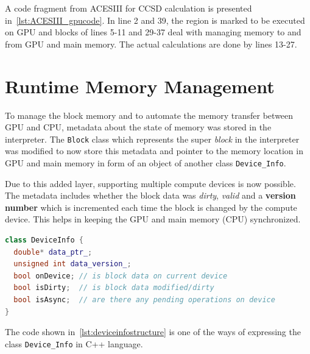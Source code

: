 A code fragment from ACESIII for CCSD calculation is presented
in~\ref{lst:ACESIII_gpucode}. In line 2 and 39, the region is marked to be executed
on GPU and blocks of lines 5-11 and 29-37 deal with managing memory to and from
GPU and main memory. The actual calculations are done by lines 13-27.

\section{Runtime Memory Management}
To manage the block memory and to automate the memory transfer between GPU and CPU,
metadata about the state of memory was stored in the interpreter. The \texttt{Block} class
which represents the super \textit{block} in the interpreter was modified to now store
this metadata and pointer to the memory location in GPU and main memory in form of
an object of another class \texttt{Device\_Info}.

Due to this added layer, supporting multiple compute devices is now possible.
The metadata includes whether the block data was \textit{dirty}, \textit{valid}
and a \textbf{version number} which is incremented each time the block is changed
by the compute device. This helps in keeping the GPU and main memory (CPU)
synchronized.

\begin{lstlisting}[caption={\texttt{Device\_Info} Class structure},
  language=C++,
  label={lst:deviceinfostructure}]
class DeviceInfo {
  double* data_ptr_;
  unsigned int data_version_;
  bool onDevice; // is block data on current device
  bool isDirty;  // is block data modified/dirty
  bool isAsync;  // are there any pending operations on device
}
\end{lstlisting}

The code shown in~\ref{lst:deviceinfostructure} is one of the ways of expressing
the class \texttt{Device\_Info} in C++ language.

